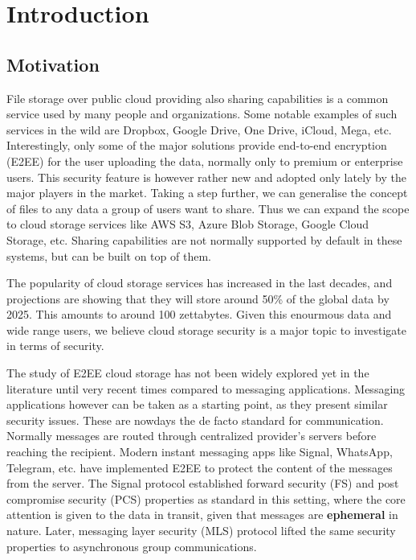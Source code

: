 \chapter{Introduction}


\section{Motivation}

File storage over public cloud providing also sharing capabilities is a common service used by many people and organizations.
Some notable examples of such services in the wild are Dropbox, Google Drive, One Drive, iCloud, Mega, etc.
Interestingly, only some of the major solutions provide end-to-end encryption (E2EE) for the user uploading 
the data, normally only to premium or enterprise users.\cite{Dropbox}\cite{googleWorkspaceE2EE}\cite{Apple}\cite{Mega}
This security feature is however rather new and adopted only lately by the major players in the market.
Taking a step further, we can generalise the concept of files to any data a group of users want to share.
Thus we can expand the scope to cloud storage services like AWS S3, Azure Blob Storage, Google Cloud Storage, etc.
Sharing capabilities are not normally supported by default in these systems, but can be built on top of them.

The popularity of cloud storage services has increased in the last decades,
and projections are showing that they will store around 50\% of the global data by 2025.
This amounts to around 100 zettabytes.\cite{SteveMorgan}
Given this enourmous data and wide range users, we believe cloud storage security is a major topic to investigate in terms of security.

The study of E2EE cloud storage has not been widely explored yet in the literature until very recent times compared to messaging applications.\cite{EPRINT:BDGHP24}
Messaging applications however can be taken as a starting point, as they present similar security issues.
These are nowdays the de facto standard for communication.
Normally messages are routed through centralized provider's servers before reaching the recipient.
Modern instant messaging apps like Signal, WhatsApp, Telegram, etc. 
have implemented E2EE to protect the content of the messages from the server.
The Signal protocol established forward security (FS) and post compromise security (PCS)
properties as standard in this setting, where the core attention is given to the data in transit,
given that messages are \textbf{ephemeral} in nature. 
Later, messaging layer security (MLS) protocol lifted the same security properties to asynchronous
group communications.

